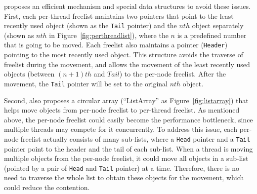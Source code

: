 
\NM{} proposes an efficient mechanism and special data structures to avoid these issues. First, each per-thread freelist maintains two pointers that point to the least recently used object (shown as the \texttt{Tail} pointer) and the $nth$ object separately (shown as $nth$ in Figure~\ref{fig:perthreadlist}), where the $n$ is a predefined number that is going to be moved. Each freelist also maintains a pointer (\texttt{Header}) pointing to the most recently used object. This structure avoids the traverse of freelist during the movement, and allows the movement of the least recently used objects (between $(n+1)th$ and $Tail$) to the per-node freelist. After the movement, the \texttt{Tail} pointer will be set to the original $nth$ object. 



Second, \NM{} also proposes a circular array (``ListArray'' as Figure~\ref{fig:listarray}) that helps move objects from per-node freelist to per-thread freelist. As mentioned above, the per-node freelist could easily become the performance bottleneck, since multiple threads may compete for it concurrently. To address this issue, each per-node freelist actually consists of many sub-lists, where a \texttt{Head} pointer and a \texttt{Tail} pointer point to the header and the tail of each sub-list. When a thread is moving multiple objects from the per-node freelist, it could move all objects in a sub-list (pointed by a pair of \texttt{Head} and \texttt{Tail} pointer) at a time. Therefore, there is no need to traverse the whole list to obtain these objects for the movement, which could reduce the contention. 

